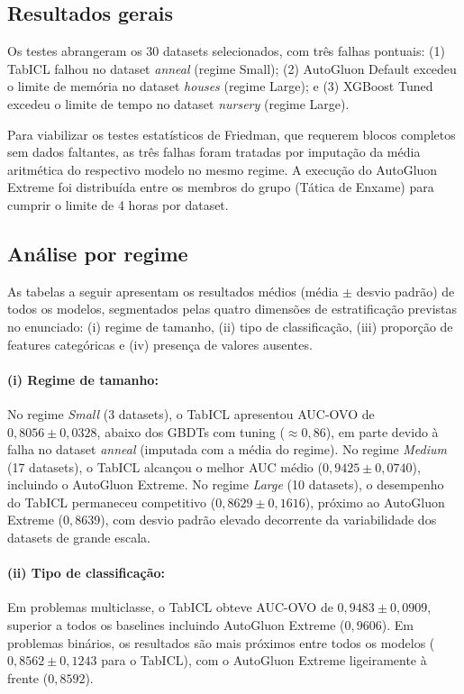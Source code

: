 \documentclass[12pt,a4paper]{article}
\begin{document}
\subsection{Resultados gerais}
Os testes abrangeram os 30 datasets selecionados, com três falhas pontuais: (1) TabICL falhou no dataset \textit{anneal} (regime Small); (2) AutoGluon Default excedeu o limite de memória no dataset \textit{houses} (regime Large); e (3) XGBoost Tuned excedeu o limite de tempo no dataset \textit{nursery} (regime Large). 

Para viabilizar os testes estatísticos de Friedman, que requerem blocos completos sem dados faltantes, as três falhas foram tratadas por imputação da média aritmética do respectivo modelo no mesmo regime. A execução do AutoGluon Extreme foi distribuída entre os membros do grupo (Tática de Enxame) para cumprir o limite de 4 horas por dataset.

\subsection{Análise por regime}

As tabelas a seguir apresentam os resultados médios (média $\pm$ desvio padrão) de todos os modelos, segmentados pelas quatro dimensões de estratificação previstas no enunciado: (i) regime de tamanho, (ii) tipo de classificação, (iii) proporção de features categóricas e (iv) presença de valores ausentes.



\paragraph{(i) Regime de tamanho:} No regime \textit{Small} (3 datasets), o TabICL apresentou AUC-OVO de $0{,}8056 \pm 0{,}0328$, abaixo dos GBDTs com tuning ($\approx 0{,}86$), em parte devido à falha no dataset \textit{anneal} (imputada com a média do regime). No regime \textit{Medium} (17 datasets), o TabICL alcançou o melhor AUC médio ($0{,}9425 \pm 0{,}0740$), incluindo o AutoGluon Extreme. No regime \textit{Large} (10 datasets), o desempenho do TabICL permaneceu competitivo ($0{,}8629 \pm 0{,}1616$), próximo ao AutoGluon Extreme ($0{,}8639$), com desvio padrão elevado decorrente da variabilidade dos datasets de grande escala.

\paragraph{(ii) Tipo de classificação:} Em problemas multiclasse, o TabICL obteve AUC-OVO de $0{,}9483 \pm 0{,}0909$, superior a todos os baselines incluindo AutoGluon Extreme ($0{,}9606$). Em problemas binários, os resultados são mais próximos entre todos os modelos ($0{,}8562 \pm 0{,}1243$ para o TabICL), com o AutoGluon Extreme ligeiramente à frente ($0{,}8592$).
\end{document}
